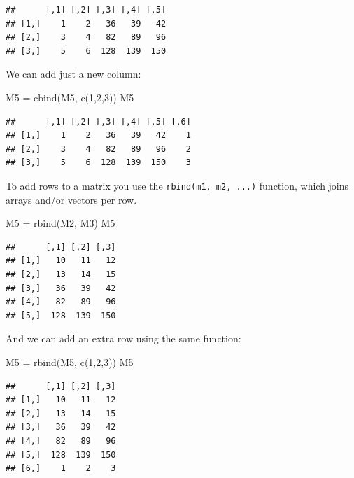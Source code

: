 \documentclass[
]{book}
\newenvironment{Shaded}{\begin{snugshade}}{\end{snugshade}}
\newcommand{\DecValTok}[1]{\textcolor[rgb]{0.00,0.00,0.81}{#1}}
\newcommand{\FunctionTok}[1]{\textcolor[rgb]{0.00,0.00,0.00}{#1}}
\newcommand{\NormalTok}[1]{#1}
\newcommand{\OtherTok}[1]{\textcolor[rgb]{0.56,0.35,0.01}{#1}}
\begin{document}
\begin{verbatim}
##      [,1] [,2] [,3] [,4] [,5]
## [1,]    1    2   36   39   42
## [2,]    3    4   82   89   96
## [3,]    5    6  128  139  150
\end{verbatim}

We can add just a new column:

\begin{Shaded}
\begin{Highlighting}[]
\NormalTok{M5 }\OtherTok{=} \FunctionTok{cbind}\NormalTok{(M5, }\FunctionTok{c}\NormalTok{(}\DecValTok{1}\NormalTok{,}\DecValTok{2}\NormalTok{,}\DecValTok{3}\NormalTok{))}
\NormalTok{M5}
\end{Highlighting}
\end{Shaded}

\begin{verbatim}
##      [,1] [,2] [,3] [,4] [,5] [,6]
## [1,]    1    2   36   39   42    1
## [2,]    3    4   82   89   96    2
## [3,]    5    6  128  139  150    3
\end{verbatim}

To add rows to a matrix you use the \texttt{rbind(m1,\ m2,\ ...)} function, which joins arrays and/or vectors per row.

\begin{Shaded}
\begin{Highlighting}[]
\NormalTok{M5 }\OtherTok{=} \FunctionTok{rbind}\NormalTok{(M2, M3)}
\NormalTok{M5}
\end{Highlighting}
\end{Shaded}

\begin{verbatim}
##      [,1] [,2] [,3]
## [1,]   10   11   12
## [2,]   13   14   15
## [3,]   36   39   42
## [4,]   82   89   96
## [5,]  128  139  150
\end{verbatim}

And we can add an extra row using the same function:

\begin{Shaded}
\begin{Highlighting}[]
\NormalTok{M5 }\OtherTok{=} \FunctionTok{rbind}\NormalTok{(M5, }\FunctionTok{c}\NormalTok{(}\DecValTok{1}\NormalTok{,}\DecValTok{2}\NormalTok{,}\DecValTok{3}\NormalTok{))}
\NormalTok{M5}
\end{Highlighting}
\end{Shaded}

\begin{verbatim}
##      [,1] [,2] [,3]
## [1,]   10   11   12
## [2,]   13   14   15
## [3,]   36   39   42
## [4,]   82   89   96
## [5,]  128  139  150
## [6,]    1    2    3
\end{verbatim}
\end{document}
